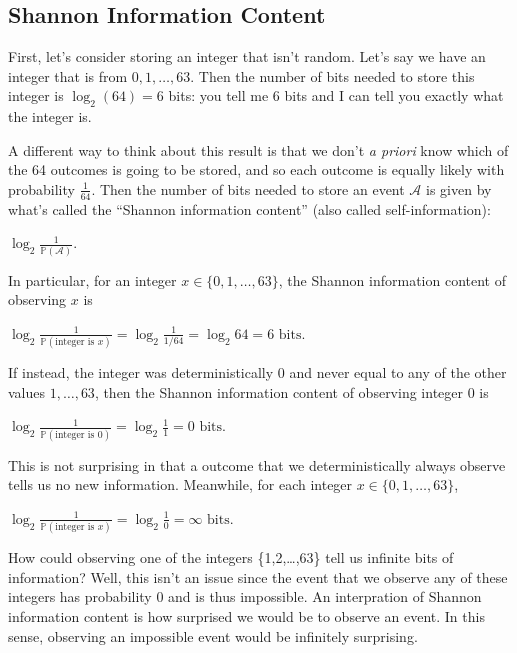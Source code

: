 \documentclass[6008notes.tex]{subfiles}
\begin{document}
\subsection{Shannon Information Content}

First, let's consider storing an integer that isn't random. Let's say we have an integer that is from $0,1,\dots ,63$. Then the number of bits needed to store this integer is $\log_2(64)=6$ bits: you tell me 6 bits and I can tell you exactly what the integer is.

A different way to think about this result is that we don't \textit{a priori} know which of the 64 outcomes is going to be stored, and so each outcome is equally likely with probability $\frac{1}{64}$. Then the number of bits needed to store an event $\mathcal{A}$ is given by what's called the ``Shannon information content'' (also called self-information):

{\centering$\log _{2}\frac{1}{\mathbb {P}(\mathcal{A})}.$ \par}

In particular, for an integer $x\in \{ 0,1,\dots ,63\}$, the Shannon information content of observing $x$ is

{\centering$\log _{2}\frac{1}{\mathbb {P}(\text {integer is }x)}=\log _{2}\frac{1}{1/64}=\log _{2}64=6\text { bits}.$ \par}
 
If instead, the integer was deterministically 0 and never equal to any of the other values $1,\dots ,63$, then the Shannon information content of observing integer 0 is

{\centering$\log _{2}\frac{1}{\mathbb {P}(\text {integer is }0)}=\log _{2}\frac{1}{1}=0\text { bits}.$ \par}

This is not surprising in that a outcome that we deterministically always observe tells us no new information. Meanwhile, for each integer $x\in \{ 0,1,\dots ,63\}$,

{\centering$\log _{2}\frac{1}{\mathbb {P}(\text {integer is }x)}=\log _{2}\frac{1}{0}=\infty \text { bits}.$ \par}
 
How could observing one of the integers \{1,2,\dots ,63\} tell us infinite bits of information? Well, this isn't an issue since the event that we observe any of these integers has probability 0 and is thus impossible. An interpration of Shannon information content is how surprised we would be to observe an event. In this sense, observing an impossible event would be infinitely surprising.
\end{document}
